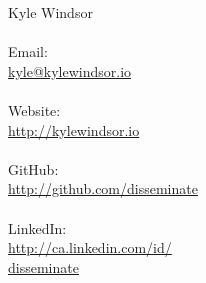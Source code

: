 
\begin{minipage}[t]{0.25\hsize} %
	{\huge Kyle Windsor}\\
	\vspace{0.1in}\\
	{\color{contact}
	Email:\\
	\href{mailto:kyle@kylewindsor.io}{kyle@kylewindsor.io}\\
	\\
	Website:\\
	\href{http://kylewindsor.io}{http://kylewindsor.io}\\
	\\
	GitHub:\\
	\href{http://github.com/disseminate/}{http://github.com/disseminate}\\
	\\
	LinkedIn:\\
	\href{http://ca.linkedin.com/in/disseminate}{http://ca.linkedin.com/id/\\disseminate}\\
	\\
	}
\end{minipage}
